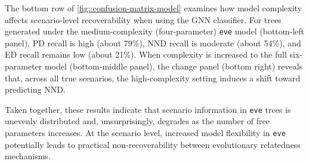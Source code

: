 {The bottom row of \autoref{fig::confusion-matrix-model} examines how model complexity affects scenario-level recoverability when using the GNN classifier. For trees generated under the medium-complexity (four-parameter) \texttt{eve} model (bottom-left panel), PD recall is high (about 79\%), NND recall is moderate (about 54\%), and ED recall remains low (about 21\%). When complexity is increased to the full six-parameter model (bottom-middle panel), the change panel (bottom right) reveals that, across all true scenarios, the high-complexity setting induces a shift toward predicting NND.

Taken together, these results indicate that scenario information in \texttt{eve} trees is unevenly distributed and, unsurprisingly, degrades as the number of free parameters increases. At the scenario level, increased model flexibility in \texttt{eve} potentially leads to practical non-recoverability between evolutionary relatedness mechanisms.

}
